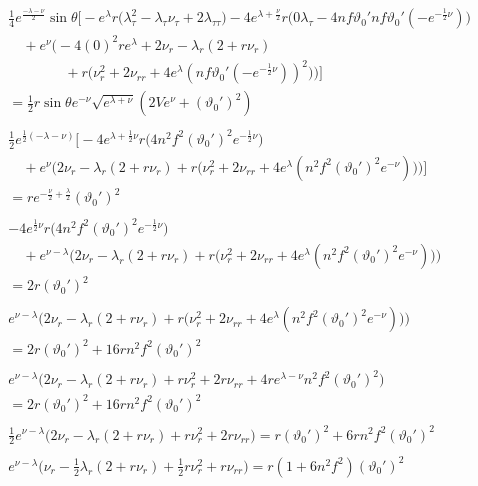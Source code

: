 \documentclass[12pt]{article}
\begin{document}
\begin{align}
&\frac{1}{4} e^{\frac{-\lambda-\nu}{2}} \sin\theta \Big[
 - e^{\lambda} r \big( \lambda_\tau^2 - \lambda_\tau \nu_\tau + 2 \lambda_{\tau\tau} \big) - 4 e^{\lambda+\frac{\nu}{2}} r \big( 0\lambda_\tau - 4 n f \vartheta_0'n f \vartheta_0' (-e^{-\frac{1}{2}\nu}) \big) \nonumber\\
 & \quad + e^{\nu} \big( -4 (0)^2 r e^{\lambda} + 2 \nu_r - \lambda_r (2 + r \nu_r) \nonumber\\
 & \qquad\qquad + r \big( \nu_r^2 + 2 \nu_{rr} + 4 e^{\lambda} (n f \vartheta_0' (-e^{-\frac{1}{2}\nu}))^2 \big) \big)
\Big] \nonumber \\
& = \frac{1}{2} r \sin\theta e^{-\nu} \sqrt{e^{\lambda+\nu}} \left( 2V e^{\nu} + (\vartheta_0')^2 \right) \nonumber \\ \nonumber \\
&\frac{1}{2} e^{\frac{1}{2}(-\lambda-\nu)} \Big[
 - 4 e^{\lambda+\frac{1}{2}\nu} r \big(4 n^2 f^2 (\vartheta_0')^2 e^{-\frac{1}{2}\nu} \big) \nonumber \\
& \quad + e^{\nu} \big(2 \nu_r - \lambda_r (2 + r \nu_r) + r \big( \nu_r^2 + 2 \nu_{rr} + 4 e^{\lambda} (n^2 f^2 (\vartheta_0')^2 e^{-\nu}) \big) \big)
\Big] \nonumber \\
& = r e^{-\frac{\nu}{2} + \frac{\lambda}{2}} (\vartheta_0')^2 \nonumber \\ \nonumber \\
& - 4 e^{\frac{1}{2}\nu} r \big(4 n^2 f^2 (\vartheta_0')^2 e^{-\frac{1}{2}\nu} \big) \nonumber \\
& \quad + e^{\nu-\lambda} \big(2 \nu_r - \lambda_r (2 + r \nu_r) + r \big( \nu_r^2 + 2 \nu_{rr} + 4 e^{\lambda} (n^2 f^2 (\vartheta_0')^2 e^{-\nu}) \big) \big) \nonumber \\
& = 2r (\vartheta_0')^2 \nonumber \\ \nonumber \\
&e^{\nu-\lambda} \big(2 \nu_r - \lambda_r (2 + r \nu_r) + r \big( \nu_r^2 + 2 \nu_{rr} + 4 e^{\lambda} (n^2 f^2 (\vartheta_0')^2 e^{-\nu}) \big) \big) \nonumber \\
& = 2r (\vartheta_0')^2 + 16 r n^2 f^2 (\vartheta_0')^2 \nonumber \\ \nonumber \\
&e^{\nu-\lambda} \big(2 \nu_r - \lambda_r (2 + r \nu_r) + r\nu_r^2 + 2r \nu_{rr} + 4r e^{\lambda-\nu} n^2 f^2 (\vartheta_0')^2 \big) \nonumber \\
& = 2r (\vartheta_0')^2 + 16 r n^2 f^2 (\vartheta_0')^2 \nonumber \\ \nonumber \\
&\frac{1}{2}e^{\nu-\lambda} \big(2 \nu_r - \lambda_r (2 + r \nu_r) + r\nu_r^2 + 2r \nu_{rr} \big) = r (\vartheta_0')^2 + 6 r n^2 f^2 (\vartheta_0')^2 \nonumber \\ \nonumber \\
&e^{\nu-\lambda} \big(\nu_r - \frac{1}{2} \lambda_r (2 + r \nu_r) + \frac{1}{2}r\nu_r^2 + r\nu_{rr} \big) = r \left(1 + 6 n^2 f^2\right) (\vartheta_0')^2
\end{align}
\end{document}
